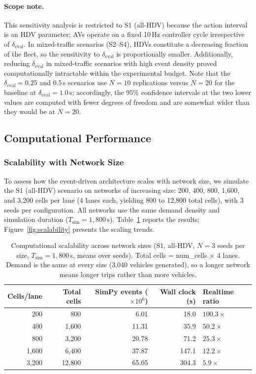 \documentclass[review,authoryear]{elsarticle}
\begin{document}
\paragraph{Scope note.} This sensitivity analysis is restricted to S1 (all-HDV) because the action interval is an HDV parameter; AVs operate on a fixed 10\,Hz controller cycle irrespective of $\delta_{\text{eval}}$. In mixed-traffic scenarios (S2--S4), HDVs constitute a decreasing fraction of the fleet, so the sensitivity to $\delta_{\text{eval}}$ is proportionally smaller. Additionally, reducing $\delta_{\text{eval}}$ in mixed-traffic scenarios with high event density proved computationally intractable within the experimental budget. Note that the $\delta_{\text{eval}} = 0.25$ and $0.5$\,s scenarios use $N = 10$ replications versus $N = 20$ for the baseline at $\delta_{\text{eval}} = 1.0$\,s; accordingly, the 95\% confidence intervals at the two lower values are computed with fewer degrees of freedom and are somewhat wider than they would be at $N = 20$.


\subsection{Computational Performance}
\label{sec:exp_performance_new}

\subsubsection{Scalability with Network Size}
\label{sec:exp_scalability}

To assess how the event-driven architecture scales with network size, we simulate the S1 (all-HDV) scenario on networks of increasing size: 200, 400, 800, 1{,}600, and 3{,}200 cells per lane (4 lanes each, yielding 800 to 12{,}800 total cells), with 3 seeds per configuration. All networks use the same demand density and simulation duration ($T_{\text{sim}} = 1{,}800$\,s). Table~\ref{tab:scalability} reports the results; Figure~\ref{fig:scalability} presents the scaling trends.

\begin{table}[ht]
\centering
\caption{Computational scalability across network sizes (S1, all-HDV, $N = 3$ seeds per size, $T_{\text{sim}} = 1{,}800$\,s, means over seeds). Total cells = num\_cells $\times$ 4 lanes. Demand is the same at every size (3{,}040 vehicles generated), so a longer network means longer trips rather than more vehicles.}
\label{tab:scalability}
\begin{tabular}{@{}rrrrl@{}}
\toprule
Cells/lane & Total cells & SimPy events ($\times 10^6$) & Wall clock (s) & Realtime ratio \\
\midrule
200 & 800 & 6.01 & 18.0 & $100.3\times$ \\
400 & 1{,}600 & 11.31 & 35.9 & $50.2\times$ \\
800 & 3{,}200 & 20.78 & 71.2 & $25.3\times$ \\
1{,}600 & 6{,}400 & 37.87 & 147.1 & $12.2\times$ \\
3{,}200 & 12{,}800 & 65.05 & 304.3 & $5.9\times$ \\
\bottomrule
\end{tabular}
\end{table}
\end{document}
